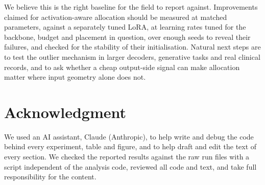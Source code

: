 \documentclass[conference]{IEEEtran}
\begin{document}
We believe this is the right baseline for the field to report against.
Improvements claimed for activation-aware allocation should be measured at
matched parameters, against a separately tuned LoRA, at learning rates tuned for
the backbone, budget and placement in question, over enough seeds to reveal
their failures, and checked for the stability of their initialisation. Natural
next steps are to test the outlier mechanism in larger decoders, generative
tasks and real clinical records, and to ask whether a cheap output-side signal
can make allocation matter where input geometry alone does not.

\section*{Acknowledgment}
We used an AI assistant, Claude (Anthropic), to help write and debug the code
behind every experiment, table and figure, and to help draft and edit the text of
every section. We checked the reported results against the raw run files with a
script independent of the analysis code, reviewed all code and text, and take
full responsibility for the content.



\end{document}
